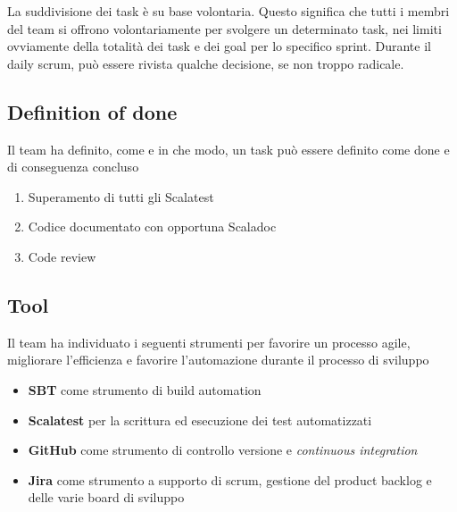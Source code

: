 La suddivisione dei task è su base volontaria. Questo significa che tutti i membri del team si offrono volontariamente per svolgere un determinato task, nei limiti ovviamente della totalità dei task e dei goal per lo specifico sprint.
Durante il daily scrum, può essere rivista qualche decisione, se non troppo radicale.

\subsection{Definition of done}

Il team ha definito, come e in che modo, un task può essere definito come done e di conseguenza concluso
\begin{enumerate}
    \item Superamento di tutti gli Scalatest
    \item Codice documentato con opportuna Scaladoc
    \item Code review 
\end{enumerate}

\subsection{Tool}

Il team ha individuato i seguenti strumenti per favorire un processo agile, migliorare l'efficienza e favorire l'automazione durante il processo di sviluppo
\begin{itemize}
    \item \textbf{SBT} come strumento di build automation
    \item \textbf{Scalatest} per la scrittura ed esecuzione dei test automatizzati
    \item \textbf{GitHub} come strumento di controllo versione e \textit{continuous integration}
    \item \textbf{Jira} come strumento a supporto di scrum, gestione del product backlog e delle varie board di sviluppo
\end{itemize}